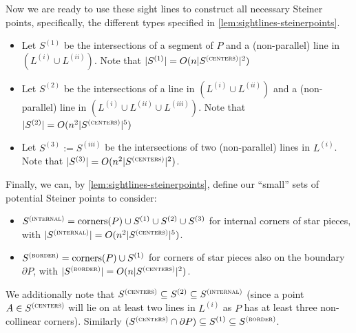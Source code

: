 \documentclass{theoretics}
\newcommand\Scen{S^{\textsc{(centers)}}}
\newcommand\Sint{S^{\textsc{(internal)}}}
\newcommand\Sbor{S^{\textsc{(border)}}}
\begin{document}
Now we are ready to use these sight lines to construct all necessary Steiner points, specifically, the different types specified in \cref{lem:sightlines-steinerpoints}.

\begin{itemize}
\item Let $S^{(1)}$ be the intersections of a segment of $P$ and a (non-parallel) line in $(L^{(i)}\cup L^{(ii)})$.
Note that $|S^{(1)}| = O(n|\Scen|^2)$
\item Let $S^{(2)}$ be the intersections of a line in $(L^{(i)}\cup L^{(ii)})$ and a (non-parallel) line in $(L^{(i)}\cup L^{(ii)}\cup L^{(iii)})$. Note that $|S^{(2)}| = O(n^2|\Scen|^5)$
\item Let $S^{(3)} := S^{(iii)}$ be the intersections of two (non-parallel) lines in $L^{(i)}$. Note that $|S^{(3)}| = O(n^2|\Scen|^2)$.
\end{itemize}

Finally, we can, by \cref{lem:sightlines-steinerpoints}, define our ``small'' sets of potential Steiner points to consider:
\begin{itemize}
    \item $\Sint = \text{corners}(P)\cup S^{(1)}\cup S^{(2)}\cup S^{(3)}$ for internal corners of star pieces, with $|\Sint| = O(n^2|\Scen|^5)$.
    \item $\Sbor = \text{corners}(P)\cup S^{(1)}$ for corners of star pieces also on the boundary $\partial P$, with
    $|\Sbor| = O(n|\Scen|^2)$.
\end{itemize}
We additionally note that $\Scen\subseteq S^{(2)}\subseteq \Sint$ (since a point $A\in \Scen$ will lie on at least two lines in $L^{(i)}$ as $P$ has at least three non-collinear corners). Similarly $(\Scen\cap \partial P)\subseteq S^{(1)}\subseteq \Sbor$.
\end{document}

